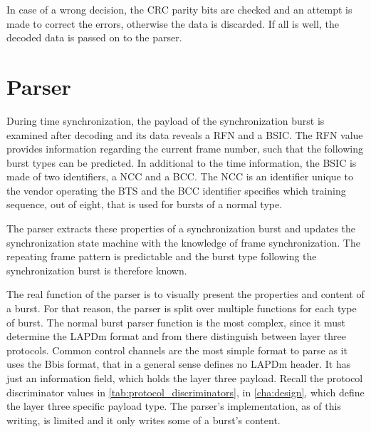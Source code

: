 In case of a wrong decision, the \gls{CRC} parity bits are checked and
an attempt is made to correct the errors, otherwise the data is
discarded. If all is well, the decoded data is passed on to the
parser.

\section{Parser}
During time synchronization, the payload of the synchronization burst
is examined after decoding and its data reveals a \gls{RFN} and a
\gls{BSIC}. The \gls{RFN} value provides information regarding the
current frame number, such that the following burst types can be
predicted. In additional to the time information, the \gls{BSIC} is
made of two identifiers, a \gls{NCC} and a \gls{BCC}. The \gls{NCC} is
an identifier unique to the vendor operating the \gls{BTS} and the
\gls{BCC} identifier specifies which training sequence, out of eight,
that is used for bursts of a normal type.

The parser extracts these properties of a synchronization burst and
updates the synchronization state machine with the knowledge of frame
synchronization. The repeating frame pattern is predictable and the
burst type following the synchronization burst is therefore known.

The real function of the parser is to visually present the properties
and content of a burst. For that reason, the parser is split over
multiple functions for each type of burst. The normal burst parser
function is the most complex, since it must determine the \gls{LAPDm}
format and from there distinguish between layer three
protocols. Common control channels are the most simple format to parse
as it uses the Bbis format, that in a general sense defines no
\gls{LAPDm} header. It has just an information field, which holds the
layer three payload. Recall the protocol discriminator values in
\cref{tab:protocol_discriminators}, in \cref{cha:design}, which define
the layer three specific payload type. The parser's implementation, as
of this writing, is limited and it only writes some of a burst's
content.
